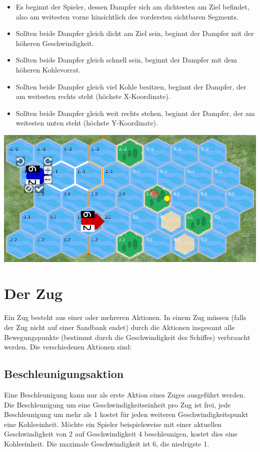 \documentclass[12pt,a4paper, ngerman, oneside]{scrartcl}
\begin{document}
\begin{itemize}
\item Es beginnt der Spieler, dessen Dampfer sich am dichtesten am Ziel befindet, also am weitesten vorne hinsichtlich des vordersten sichtbaren Segments.
\item Sollten beide Dampfer gleich dicht am Ziel sein, beginnt der Dampfer mit der höheren Geschwindigkeit.
\item Sollten beide Dampfer gleich schnell sein, beginnt der Dampfer mit dem höheren Kohlevorrat.
\item Sollten beide Dampfer gleich viel Kohle besitzen, beginnt der Dampfer, der am weitesten rechts steht (höchste X-Koordinate).
\item Sollten beide Dampfer gleich weit rechts stehen, beginnt der Dampfer, der am weitesten unten steht (höchste Y-Koordinate).
\end{itemize}

{
\centering
\includegraphics[width=1.0\textwidth]{bilder/overtakeline.png}
}

\section{Der Zug}

Ein Zug besteht aus einer oder mehreren Aktionen. In einem Zug
müssen (falls der Zug nicht auf einer Sandbank endet) durch die Aktionen
insgesamt alle Bewegungspunkte (bestimmt durch die Geschwindigkeit des Schiffes)
verbraucht werden. Die verschiedenen Aktionen sind:


\subsection{\label{acceleration}Beschleunigungsaktion}

Eine Beschleunigung kann nur als erste Aktion eines Zuges ausgeführt werden. Die
Beschleunigung um eine Geschwindigkeitseinheit pro Zug ist frei, jede
Beschleunigung um mehr als 1 kostet für jeden weiteren Geschwindigkeitspunkt
eine Kohleeinheit. Möchte ein Spieler beispielsweise mit einer aktuellen
Geschwindigkeit von 2 auf Geschwindigkeit 4 beschleunigen, kostet dies eine
Kohleeinheit. Die maximale Geschwindigkeit ist 6, die niedrigste 1.
\end{document}

